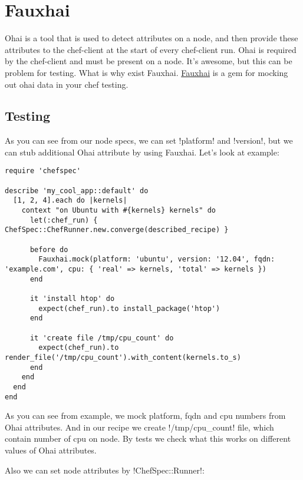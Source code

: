 \section{Fauxhai}
\label{sec:testing-fauxhai}

Ohai is a tool that is used to detect attributes on a node, and then provide these attributes to the chef-client at the start of every chef-client run. Ohai is required by the chef-client and must be present on a node. It's awesome, but this can be problem for testing. What is why exist Fauxhai. \href{http://technology.customink.com/fauxhai/}{Fauxhai} is a gem for mocking out ohai data in your chef testing.

\subsection{Testing}

As you can see from our node specs, we can set \inline!platform! and \inline!version!, but we can stub additional Ohai attribute by using Fauxhai. Let's look at example:

\begin{lstlisting}[label=lst:testing-fauxhai1]
require 'chefspec'

describe 'my_cool_app::default' do
  [1, 2, 4].each do |kernels|
    context "on Ubuntu with #{kernels} kernels" do
      let(:chef_run) { ChefSpec::ChefRunner.new.converge(described_recipe) }

      before do
        Fauxhai.mock(platform: 'ubuntu', version: '12.04', fqdn: 'example.com', cpu: { 'real' => kernels, 'total' => kernels })
      end

      it 'install htop' do
        expect(chef_run).to install_package('htop')
      end

      it 'create file /tmp/cpu_count' do
        expect(chef_run).to render_file('/tmp/cpu_count').with_content(kernels.to_s)
      end
    end
  end
end
\end{lstlisting}

As you can see from example, we mock platform, fqdn and cpu numbers from Ohai attributes. And in our recipe we create \inline!/tmp/cpu_count! file, which contain number of cpu on node. By tests we check what this works on different values of Ohai attributes.

Also we can set node attributes by \inline!ChefSpec::Runner!:

